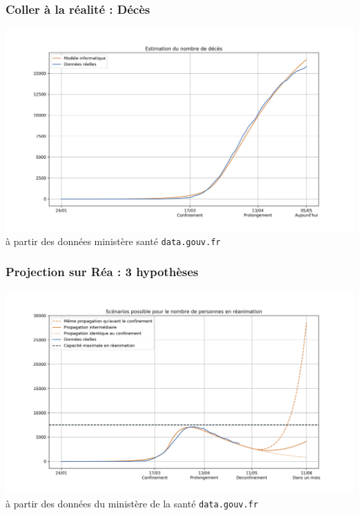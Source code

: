 \documentclass[a4paper]{cours-bdd}
\begin{document}

\begin{frame}[fragile]
\frametitle{Coller à la réalité : Décès}

  \begin{center}
    \includegraphics[width=1.0\linewidth]{figure2.jpg} \\
    {\tiny à partir des données ministère santé \texttt{data.gouv.fr}}
  \end{center}
  
\end{frame}


\begin{frame}[fragile]
\frametitle{Projection sur Réa : 3 hypothèses}

  \begin{center}
    \includegraphics[width=1.0\linewidth]{figure3.jpg} \\
    {\tiny à partir des données du ministère de la santé \texttt{data.gouv.fr}}
  \end{center}
  
\end{frame}
\end{document}
